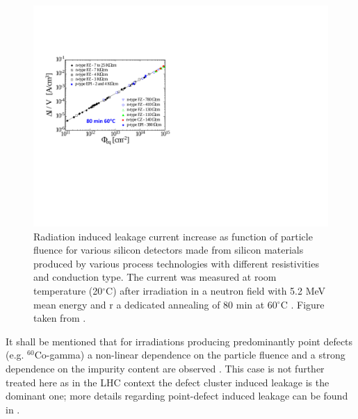 \begin{figure}[bth]
\centering
\includegraphics[width=0.6\linewidth]{figures/RadiationEffects/Sensors/1999-Moll-phd-basic-leakage-fluence.pdf}
\caption{
Radiation induced leakage current increase as function of particle fluence for various silicon detectors made from 
silicon materials produced by various process technologies with different resistivities and conduction type. The current was 
measured at room temperature (20$^\circ$C) after irradiation in a neutron field with 5.2 MeV mean energy and r a dedicated annealing of 80 min at 60$^\circ$C .
Figure taken from \cite{1999-Moll-phd}.}
\label{fig:1999-Moll-phd-basic-leakage-fluence}
\end{figure}

It shall be mentioned that for irradiations producing predominantly point defects (e.g. $^{60}$Co-gamma) a non-linear dependence on the particle fluence and a strong dependence on the impurity content are observed \cite{2003-Pintilie-gamma}. This case is not further treated here as in the LHC context the defect cluster induced leakage is the dominant one; more details regarding point-defect induced leakage can be found in \cite{2009-Pintilie-cluster}. 
